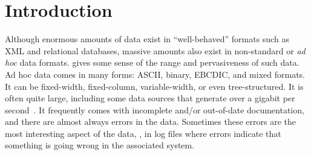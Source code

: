 \section{Introduction}
\label{section:intro}
Although enormous amounts of data exist in ``well-behaved'' formats such
as XML and relational databases, massive amounts also exist in
non-standard or \textit{ad hoc} data formats. 
gives some sense of the range and pervasiveness of such data.
Ad hoc data comes in many forms: ASCII, binary, EBCDIC, and mixed
formats.  It can be fixed-width, fixed-column, variable-width, or even
tree-structured. It is often quite large, including some data sources
that generate over a gigabit per second~\cite{gigascope}. It frequently
comes with incomplete and/or out-of-date documentation, and there are
almost always errors in the data.  Sometimes these errors are the most
interesting aspect of the data, \eg{}, in log files where
errors indicate that something is going wrong in the associated
system.

